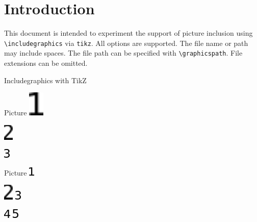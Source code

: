 \documentclass{article}
\begin{document}
\section*{Introduction}

This document is intended to experiment the support of picture inclusion using 
\verb|\includegraphics| via \texttt{tikz}. All options are supported.  The file 
name or path may include spaces. The file path can be specified with 
\verb|\graphicspath|. File extensions can be omitted.

\begin{quiz}{Includegraphics with TikZ}

\begin{multi}{Picture}
\includegraphics[width=2em,angle=90]{fig/1 1.PNG}
\item* \includegraphics[scale=.5]{fig/2 2.pdf}
\item \includegraphics{fig/3.png}
\end{multi}

\graphicspath{{./fig/}}
\begin{matching}[dd]{Picture}
\includegraphics{1 1}
\item \includegraphics[angle=45]{2 2} \answer \includegraphics{3}
\item \includegraphics[angle=-45]{4} \answer \includegraphics{5}
\end{matching}

\end{quiz}
\end{document}
